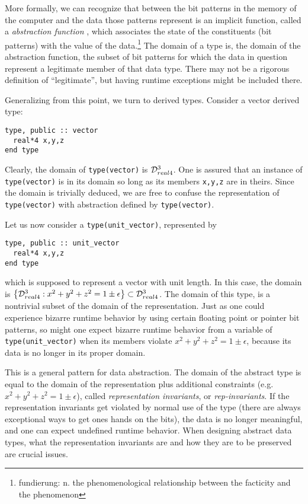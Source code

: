 More formally, we can recognize that between the bit patterns in the
memory of the computer and the data those patterns represent is an
implicit function, called a {\em abstraction function}
\cite{LiskovGuttag.RedBook}, which associates
the state of the constituents (bit patterns) with the value of the
data.\footnote{fundierung: n. the phenomenological relationship
between the facticity and the phenomenon} The domain of a type is, the
domain of the abstraction function, the subset of bit patterns for
which the data in question represent a legitimate member of that data
type.  There may not be a rigorous definition of ``legitimate'', but
having runtime exceptions might be included there.

Generalizing from this point, we turn to derived types.  Consider a vector
derived type:
\begin{verbatim}
type, public :: vector
  real*4 x,y,z
end type
\end{verbatim}
Clearly, the domain of \verb+type(vector)+ is ${\cal D}_{real4}^3$.  
One is assured that an instance of \verb+type(vector)+ is in its domain
so long as its members \verb+x,y,z+ are in theirs.  Since the 
domain is trivially deduced, we are free to confuse the representation
of \verb+type(vector)+ with abstraction defined by \verb+type(vector)+.

Let us now consider a \verb+type(unit_vector)+, represented by
\begin{verbatim}
type, public :: unit_vector
  real*4 x,y,z
end type
\end{verbatim}
which is supposed to represent a vector with unit length.
In this
case, the domain is $\left\{ {\cal D}_{real4}^3 : x^2+y^2+z^2 = 1 \pm
\epsilon \right\} \subset {\cal D}_{real4}^3$.  The domain of this
type, is a nontrivial subset of the domain of the representation.
Just as one could experience bizarre runtime behavior by using certain
floating point or pointer bit patterns, so might one expect bizarre
runtime behavior from a variable of \verb+type(unit_vector)+ when its
members violate $x^2+y^2+z^2 = 1 \pm \epsilon$, because its data is
no longer in its proper domain.

This is a general pattern for data abstraction.  The domain of the
abstract type is equal to the domain of the representation plus
additional constraints (e.g.  $x^2+y^2+z^2 = 1 \pm \epsilon$), called
{\em representation invariants}, or {\em rep-invariants}.  If the
representation invariants get violated by normal use of the type
(there are always exceptional ways to get ones hands on the bits), the
data is no longer meaningful, and one can expect undefined runtime
behavior.  When designing abstract data types, what the representation
invariants are and how they are to be preserved are crucial issues.

